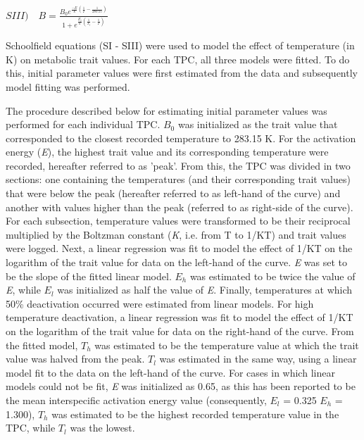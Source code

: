 \documentclass[11pt]{article}  %
\begin{document}
\begin{center}
\(SIII)\quad B = \frac{B_0 e^{\frac{-E}{k}(\frac{1}{T}-\frac{1}{283.15})}}{1+e^{\frac{E_l}{k}(\frac{1}{T_l}-\frac{1}{T})}}\)
\end{center}


Schoolfield equations (SI - SIII) were used to model the effect of temperature (in K) on metabolic trait values. For each TPC, all three models were fitted. To do this, initial parameter values were first estimated from the data and subsequently model fitting was performed. 

The procedure described below for estimating initial parameter values was performed for each individual TPC. \(B_0\) was initialized as the trait value that corresponded to the closest recorded temperature to 283.15 K. For the activation energy (\textit{E}), the highest trait value and its corresponding temperature were recorded, hereafter referred to as 'peak'. From this, the TPC was divided in two sections: one containing the temperatures (and their corresponding trait values) that were below the peak (hereafter referred to as left-hand of the curve) and another with values higher than the peak (referred to as right-side of the curve). For each subsection, temperature values were transformed to be their reciprocal multiplied by the Boltzman constant (\textit{K}, i.e. from T to 1/KT) and trait values were logged. Next, a linear regression was fit to model the effect of 1/KT on the logarithm of the trait value for data on the left-hand of the curve. \textit{E} was set to be the slope of the fitted linear model. \textit{\(E_h\)} was estimated to be twice the value of \textit{E}, while \textit{\(E_l\)} was initialized as half the value of \textit{E}. Finally, temperatures at which 50\% deactivation occurred were estimated from linear models. For high temperature deactivation, a linear regression was fit to model the effect of 1/KT on the logarithm of the trait value for data on the right-hand of the curve. From the fitted model, \textit{\(T_h\)} was estimated to be the temperature value at which the trait value was halved from the peak. \textit{\(T_l\)} was estimated in the same way, using a linear model fit to the data on the left-hand of the curve. For cases in which linear models could not be fit, \textit{E} was initialized as 0.65, as this has been reported to be the mean interspecific activation energy value \cite{Brown} (consequently, \textit{\(E_l\)} = 0.325 \textit{\(E_h\)} = 1.300), \textit{\(T_h\)} was estimated to be the highest recorded temperature value in the TPC, while \textit{\(T_l\)} was the lowest. 
\end{document}
